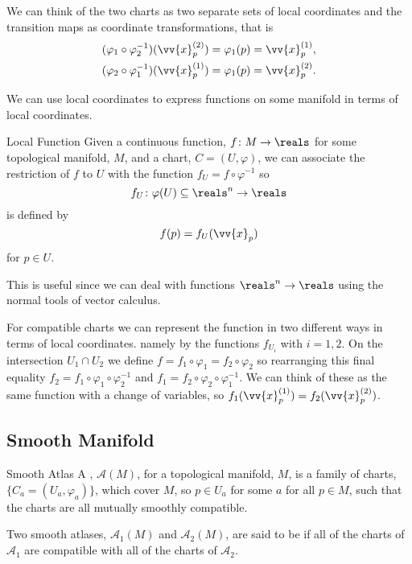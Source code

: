 \documentclass[fleqn]{NotesClass}
\begin{document}
    We can think of the two charts as two separate sets of local coordinates and the transition maps as coordinate transformations, that is
    \begin{align}
        (\varphi_1 \circ \varphi_2^{-1})(\vv{x}_p^{(2)}) &= \varphi_1(p) = \vv{x}_p^{(1)},\\
        (\varphi_2 \circ \varphi_1^{-1})(\vv{x}_p^{(1)}) &= \varphi_1(p) = \vv{x}_p^{(2)}.
    \end{align}
    
    We can use local coordinates to express functions on some manifold in terms of local coordinates.
    
    \begin{dfn}{Local Function}{}
        Given a continuous function, \(f \colon M \to \reals\) for some topological manifold, \(M\), and a chart, \(C = (U, \varphi)\), we can associate the restriction of \(f\) to \(U\) with the function \(f_U = f \circ \varphi^{-1}\) so
        \begin{equation}
            f_U \colon \varphi(U) \subseteq \reals^n \to \reals
        \end{equation}
        is defined by
        \begin{equation}
            f(p) = f_U(\vv{x}_p)
        \end{equation}
        for \(p \in U\).
    \end{dfn}
    
    This is useful since we can deal with functions \(\reals^n \to \reals\) using the normal tools of vector calculus.
    
    For compatible charts we can represent the function in two different ways in terms of local coordinates.
    namely by the functions \(f_{U_i}\) with \(i = 1, 2\).
    On the intersection \(U_1 \cap U_2\) we define \(f = f_1 \circ \varphi_1 = f_2 \circ \varphi_2\) so rearranging this final equality \(f_2 = f_1 \circ \varphi_1 \circ \varphi_2^{-1}\) and \(f_1 = f_2 \circ \varphi_2 \circ \varphi_1^{-1}\).
    We can think of these as the same function with a change of variables, so \(f_1(\vv{x}_p^{(1)}) = f_2(\vv{x}_p^{(2)})\).
    
    \subsection{Smooth Manifold}
    \begin{dfn}{Smooth Atlas}{}
        A , \(\mathcal{A}(M)\), for a topological manifold, \(M\), is a family of charts, \(\{C_a = (U_a, \varphi_a)\}\), which cover \(M\), so \(p \in U_a\) for some \(a\) for all \(p \in M\), such that the charts are all mutually smoothly compatible.
        
        Two smooth atlases, \(\mathcal{A}_1(M)\) and \(\mathcal{A}_2(M)\), are said to be  if all of the charts of \(\mathcal{A}_1\) are compatible with all of the charts of \(\mathcal{A}_2\).
    \end{dfn}
    
\end{document}
